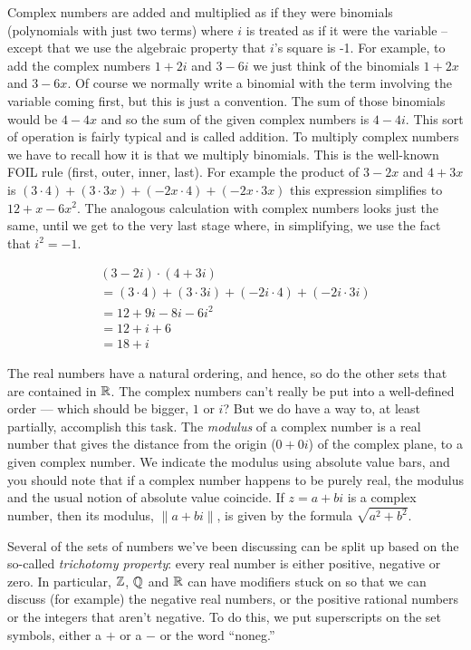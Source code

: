 Complex numbers are added and multiplied as if they were binomials
(polynomials with just two terms) where $i$ is treated as if it were 
the variable -- except that we use the algebraic property that $i$'s
square is -1.  For example, to add the complex numbers $1+2i$ and
$3-6i$ we just think of the binomials $1+2x$ and $3-6x$.  Of course we
normally write a binomial with the term involving the variable coming
first, but this is just a convention.  The sum of those binomials
would be $4-4x$ and so the sum of the given complex numbers is $4-4i$.
This sort of operation is fairly typical and is called 
 addition.  
To multiply complex numbers we have to
recall how it is that we multiply binomials.  This is the well-known
FOIL rule (first, outer, inner, last).  For example the product of
$3-2x$ and $4+3x$ is $(3\cdot 4) + (3 \cdot 3x) + (-2x\cdot 4) +
(-2x\cdot 3x)$ this expression simplifies to $12 + x - 6x^2$.  The
analogous calculation with complex numbers looks just the same, until
we get to the very last stage where, in simplifying, we use the fact
that $i^2=-1$.  

\begin{gather*}
 (3-2i)\cdot (4+3i) \\
= (3\cdot 4) + (3\cdot 3i) + (-2i\cdot 4) + (-2i\cdot 3i) \\
= 12 + 9i - 8i -6i^2 \\
= 12 + i + 6 \\
= 18 + i 
\end{gather*}


The real numbers have a natural ordering, and hence, so do the 
other sets that are contained in ${\mathbb R}$.  The complex numbers 
can't really be put into a well-defined order --- which should be
bigger, $1$  or $i$?  But we do have a way to, at least partially, 
accomplish this task.  The 
\emph{modulus} of a complex number is a real number that gives the
distance from the origin ($0+0i$) of the complex plane, to a given
complex number.  We indicate the modulus using absolute value bars,
and you should note that if a complex number happens to be purely
real, the modulus and the usual notion of absolute value coincide.
If $z = a + bi$ is a complex number, then its modulus, $\|a + bi \|$,
is given by the formula $\sqrt{a^2+b^2}$.  

Several of the sets of numbers we've been discussing can be split
up based on the so-called \emph{trichotomy property}:
every real number is either positive, negative or zero.  In particular,
${\mathbb Z}$, ${\mathbb Q}$ and ${\mathbb R}$ can have modifiers stuck on so
that we can discuss (for example) the negative real numbers, or the
positive rational numbers or the integers that aren't negative.  
To do this, we put superscripts on the set symbols, either a $+$ 
or a $-$ or the word ``noneg.''

